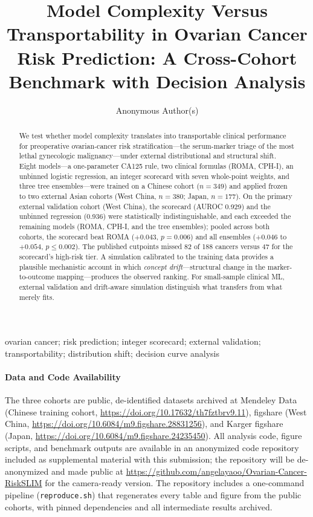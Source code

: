 \documentclass[pmlr,twocolumn,10pt]{jmlr} %
\title[Complexity vs Transportability in Ovarian Cancer Risk]{Model
Complexity Versus Transportability in Ovarian Cancer Risk Prediction: A
Cross-Cohort Benchmark with Decision Analysis}
\author{Anonymous Author(s)}
\begin{document}
\maketitle

\ifmlhdemo\else
\begin{abstract}
We test whether model complexity translates into transportable clinical
performance for preoperative ovarian-cancer risk stratification---the
serum-marker triage of the most lethal gynecologic malignancy---under
external distributional and structural shift. Eight
models---a one-parameter CA125 rule, two clinical formulas (ROMA, CPH-I),
an unbinned logistic regression, an integer scorecard with seven
whole-point weights, and three tree ensembles---were trained on a Chinese
cohort ($n=349$) and applied frozen to two external Asian cohorts (West
China, $n=380$; Japan, $n=177$). On the primary external validation cohort
(West China), the scorecard (AUROC 0.929) and the unbinned regression
(0.936) were statistically indistinguishable, and each exceeded the
remaining models (ROMA, CPH-I, and the tree ensembles); pooled across both
cohorts, the scorecard beat ROMA ($+0.043$, $p=0.006$) and all ensembles
($+0.046$ to $+0.054$, $p\le0.002$). The published cutpoints
missed 82 of 188 cancers versus 47 for the scorecard's high-risk tier. A
simulation calibrated to the training data provides a plausible
mechanistic account in which \emph{concept drift}---structural change in
the marker-to-outcome mapping---produces the observed ranking. For
small-sample clinical ML, external validation and drift-aware simulation
distinguish what transfers from what merely fits.
\end{abstract}

\begin{keywords}
ovarian cancer; risk prediction; integer scorecard; external validation;
transportability; distribution shift; decision curve analysis
\end{keywords}
\fi

\ifmlhneedsstatements
\paragraph*{Data and Code Availability}
The three cohorts are public, de-identified datasets archived at Mendeley
Data (Chinese training cohort, \url{https://doi.org/10.17632/th7fztbrv9.11}),
figshare (West China, \url{https://doi.org/10.6084/m9.figshare.28831256}),
and Karger figshare (Japan, \url{https://doi.org/10.6084/m9.figshare.24235450}).
All analysis code, figure scripts, and benchmark outputs are available in
an anonymized code repository included as supplemental material with this
submission; the repository will be de-anonymized and made public at
\url{https://github.com/angelayaoo/Ovarian-Cancer-RiskSLIM} for the
camera-ready version. The repository includes a one-command pipeline
(\texttt{reproduce.sh}) that regenerates every table and figure from the
public cohorts, with pinned dependencies and all intermediate results
archived.
\end{document}
